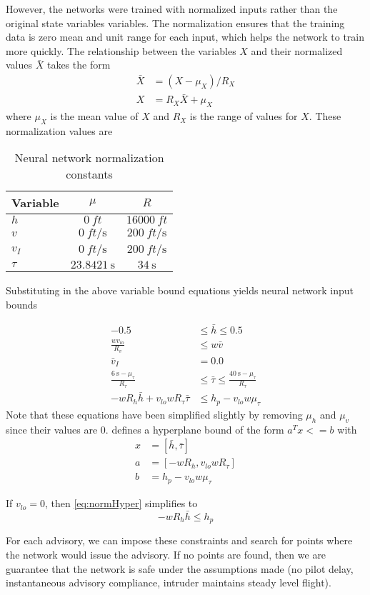 \documentclass{article}
\begin{document}
However, the networks were trained with normalized inputs rather than the original state variables variables. The normalization ensures that the training data is zero mean and unit range for each input, which helps the network to train more quickly. The relationship between the variables $X$ and their normalized values $\bar{X}$ takes the form
\begin{align}
	\bar{X} &= (X-\mu_X)/R_X \\
	X &= R_X\bar{X} + \mu_X
\end{align}
where $\mu_X$ is the mean value of $X$ and $R_X$ is the range of values for $X$. These normalization values are

\begin{table}[h!]
	\caption{Neural network normalization constants}
	\centering
	\begin{tabular}{lcc}
		\toprule
		Variable & $\mu$ & $R$ \\
		\midrule
		$h$ & $\SI{0}{ft}$ & $\SI{16000}{ft}$  \\
		$v$ & $\SI{0}{ft\per\second}$ & $\SI{200}{ft\per\second}$  \\
		$v_I$ & $\SI{0}{ft\per\second}$ & $\SI{200}{ft\per\second}$  \\
		$\tau$ & $\SI{23.8421}{\second}$ & $\SI{34}{\second}$  \\
		\bottomrule
	\end{tabular}
\end{table}

Substituting in the above variable bound equations yields neural network input bounds

\begin{align}
	-0.5 &\le \bar{h} \le 0.5 \\
	\frac{wv_{lo}}{R_v} &\le w\bar{v} \\
	\bar{v}_I &= 0.0 \\
	\frac{\SI{6}{\second}-\mu_\tau}{R_\tau} &\le \bar{\tau} \le \frac{\SI{40}{\second}-\mu_\tau}{R_\tau} \\
	-wR_h\bar{h} + v_{lo}wR_\tau\bar{\tau} &\le h_p - v_{lo} w \mu_\tau \label{eq:normHyper}
\end{align}
Note that these equations have been simplified slightly by removing $\mu_h$ and $\mu_v$ since their values are $0$.  defines a hyperplane bound of the form $a^Tx <= b$ with 
\begin{align*}
	x&=[\bar{h}, \bar{\tau}] \\
	a&=[-wR_h, v_{lo}wR_\tau] \\
	b&= h_p - v_{lo} w \mu_\tau 
\end{align*}

If $v_{lo}=0$, then \cref{eq:normHyper} simplifies to
\begin{equation}
	-wR_h\bar{h} \le h_p
\end{equation}

For each advisory, we can impose these constraints and search for points where the network would issue the advisory. If no points are found, then we are guarantee that the network is safe under the assumptions made (no pilot delay, instantaneous advisory compliance, intruder maintains steady level flight).
	
\end{document}
